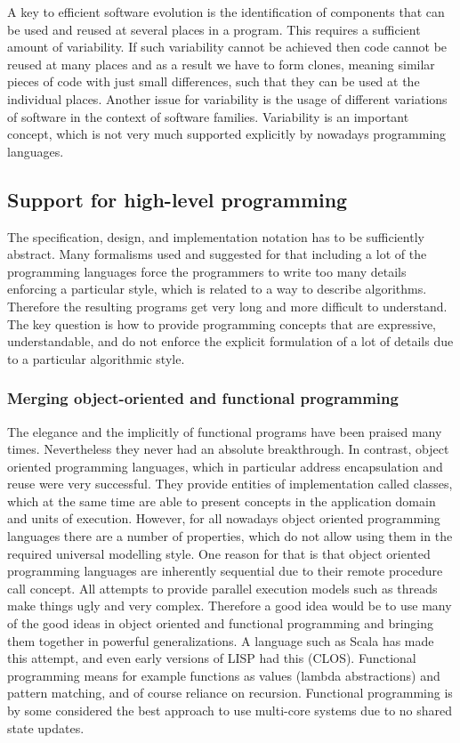 A key to efficient software evolution is the identification of 
components that can be used and reused at several places in a 
program. This requires a sufficient amount of variability. If such 
variability cannot be achieved then code cannot be reused at many 
places and as a result we have to form clones, meaning similar 
pieces of code with just small differences, such that they can be 
used at the individual places. Another issue for variability is the 
usage of different variations of software in the context of 
software families. Variability is an important concept, which is 
not very much supported explicitly by nowadays programming 
languages.

\subsection{Support for high-level programming}

The specification, design, and implementation notation has to be 
sufficiently abstract. Many formalisms used and suggested for that 
including a lot of the programming languages force the programmers 
to write too many details enforcing a particular style, which is 
related to a way to describe algorithms. Therefore the resulting 
programs get very long and more difficult to understand. The key 
question is how to provide programming concepts that are 
expressive, understandable, and do not enforce the explicit 
formulation of a lot of details due to a particular algorithmic 
style.


\subsubsection{Merging object-oriented and functional programming}

The elegance and the implicitly of functional programs have been 
praised many times. Nevertheless they never had an absolute 
breakthrough. In contrast, object oriented programming languages, 
which in particular address encapsulation and reuse were very 
successful. They provide entities of implementation called classes, 
which at the same time are able to present concepts in the 
application domain and units of execution. However, for all 
nowadays object oriented programming languages there are a number 
of properties, which do not allow using them in the required 
universal modelling style. One reason for that is that object 
oriented programming languages are inherently sequential due to 
their remote procedure call concept. All attempts to provide 
parallel execution models such as threads make things ugly and very 
complex. Therefore a good idea would be to use many of the good 
ideas in object oriented and functional programming and bringing 
them together in powerful generalizations. A language such as Scala 
has made this attempt, and even early versions of LISP had this 
(CLOS). Functional programming means for example functions as 
values (lambda abstractions) and pattern matching, and of course 
reliance on recursion. Functional programming is by some considered 
the best approach to use multi-core systems due to no shared state 
updates.

